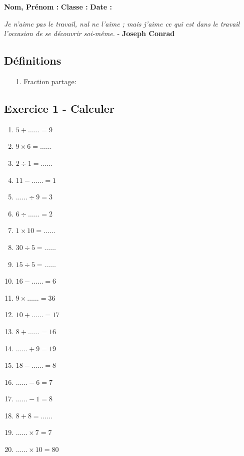 



\textbf{Nom, Prénom :} \hspace{8cm} \textbf{Classe :} \hspace{3cm} \textbf{Date :}\\
\vspace{-0.8cm}
\begin{center}
  \textit{Je n'aime pas le travail, nul ne l'aime ; mais j'aime ce qui est dans le travail l'occasion de se découvrir soi-même.}  - \textbf{Joseph Conrad}
\end{center}
\vspace{-0.8cm}

\subsection*{Définitions}
  \begin{enumerate}
    \item[1.] Fraction partage: \dotfill \\
    \Pointilles[2]
  \end{enumerate}

\subsection*{Exercice 1 - Calculer}

\begin{multicols}{3}\noindent
    \begin{enumerate}
      \item $5 + \ldots\ldots = 9$
      \item $9 \times 6 = \ldots\ldots$
      \item $2 \div 1 = \ldots\ldots$
      \item $11 - \ldots\ldots = 1$
      \item $\ldots\ldots \div 9 = 3$
      \item $6 \div \ldots\ldots = 2$
      \item $1 \times 10 = \ldots\ldots$
      \item $30 \div 5 = \ldots\ldots$
      \item $15 \div 5 = \ldots\ldots$
      \item $16 - \ldots\ldots = 6$
      \item $9 \times \ldots\ldots = 36$
      \item $10 + \ldots\ldots = 17$
      \item $8 + \ldots\ldots = 16$
      \item $\ldots\ldots + 9 = 19$
      \item $18 - \ldots\ldots = 8$
      \item $\ldots\ldots - 6 = 7$
      \item $\ldots\ldots - 1 = 8$
      \item $8 + 8 = \ldots\ldots$
      \item $\ldots\ldots \times 7 = 7$
      \item $\ldots\ldots \times 10 = 80$
    \end{enumerate}
  \end{multicols}

